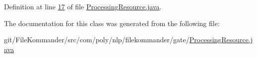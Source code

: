 Definition at line \hyperlink{L17}{17} of file \hyperlink{}{Processing\-Resource.\-java}.



The documentation for this class was generated from the following file\-:\begin{DoxyCompactItemize}
\item 
git/\-File\-Kommander/src/com/poly/nlp/filekommander/gate/\hyperlink{_processing_resource_8java}{Processing\-Resource.\-java}\end{DoxyCompactItemize}

